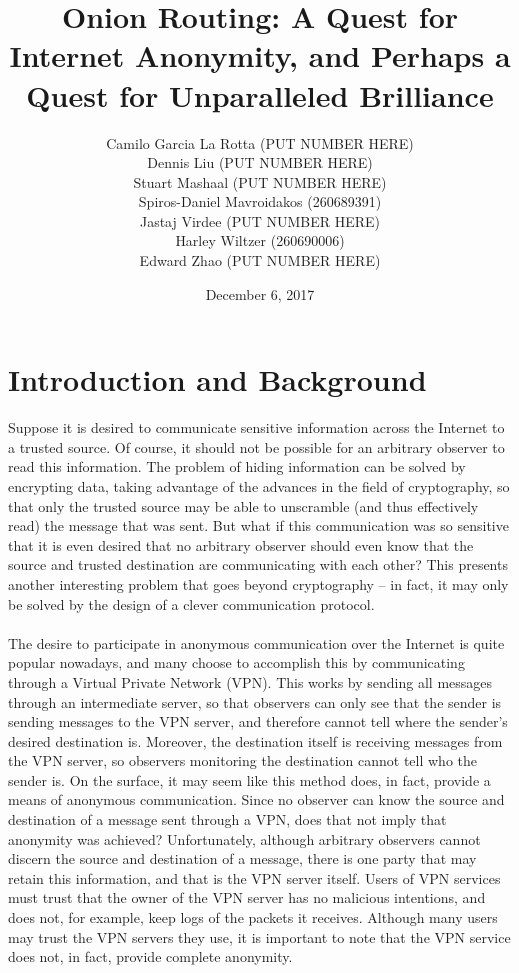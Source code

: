 \documentclass[10pt]{report}
\title{Onion Routing: A Quest for Internet Anonymity, and Perhaps a Quest for Unparalleled
Brilliance}
\author{Camilo Garcia La Rotta (PUT NUMBER HERE)\\Dennis Liu (PUT NUMBER HERE)\\Stuart
Mashaal (PUT NUMBER HERE)\\Spiros-Daniel
Mavroidakos (260689391)\\Jastaj Virdee (PUT NUMBER HERE)\\Harley Wiltzer (260690006)\\Edward Zhao
(PUT NUMBER HERE)}
\date{December 6, 2017}
\begin{document}
\maketitle
\tableofcontents
\doublespacing
\chapter{Introduction and Background}
Suppose it is desired to communicate sensitive information across the Internet to a trusted source.
Of course, it should not be possible for an arbitrary observer to read this information. The problem
of hiding information can be solved by encrypting data, taking advantage of the advances in the
field of cryptography, so that only the trusted source may be able to unscramble (and thus
effectively read) the message that was sent. But what if this communication was so sensitive that it
is even desired that no arbitrary observer should even know that the source and trusted destination
are communicating with each other? This presents another interesting problem that goes beyond
cryptography -- in fact, it may only be solved by the design of a clever communication protocol.\\\\
The desire to participate in anonymous communication over the Internet is quite popular nowadays,
and many choose to accomplish this by communicating through a Virtual Private Network (VPN). This
works by sending all messages through an intermediate server, so that observers can only see that
the sender is sending messages to the VPN server, and therefore cannot tell where the sender's
desired destination is. Moreover, the destination itself is receiving messages from the VPN server,
so observers monitoring the destination cannot tell who the sender is. On the surface, it may seem
like this method does, in fact, provide a means of anonymous communication. Since no observer can
know the source and destination of a message sent through a VPN, does that not imply that anonymity
was achieved? Unfortunately, although arbitrary observers cannot discern the source and destination
of a message, there is one party that may retain this information, and that is the VPN
server itself. Users of VPN services must trust that the owner of the VPN server has no malicious
intentions, and does not, for example, keep logs of the packets it receives. Although many users may
trust the VPN servers they use, it is important to note that the VPN service does not, in fact,
provide complete anonymity.\\\\
\end{document}
